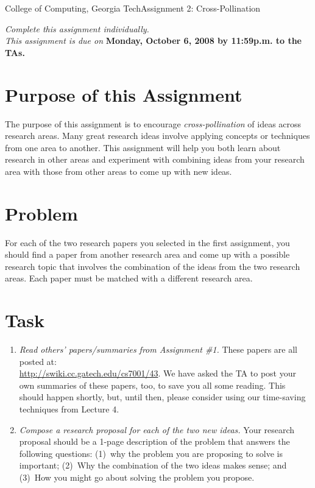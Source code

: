 \documentclass[11pt]{article}
\begin{document}


{College of Computing, Georgia Tech}{Assignment 2: Cross-Pollination}

{\em Complete this assignment individually. \\  This
  assignment is due on} {\bf Monday, October 6, 2008 by 11:59p.m. to
  the TAs.}

\section{Purpose of this Assignment}


The purpose of this assignment is to encourage {\em cross-pollination}
of ideas across research areas.  Many great research ideas involve
applying concepts or techniques from one area to another.  This
assignment will help you both learn about research in other areas and
experiment with combining ideas from your research area with those from
other areas to come up with new ideas.

\section{Problem}

For each of the two research papers you selected in the first
assignment, you should find a paper from another research area and come
up with a possible research topic that involves the combination of the
ideas from the two research areas.  Each paper must be matched with a
different research area.

\section{Task}

\begin{enumerate}
\itemsep=-1pt
\item {\em Read others' papers/summaries from Assignment \#1.} These
  papers are all posted at:\\ \url{http://swiki.cc.gatech.edu/cs7001/43}.
  We have asked the TA to post your own summaries of these papers, too,
  to save you all some reading.  This should happen shortly, but, until
  then, please consider using our time-saving techniques from Lecture 4.
%
\item {\em Compose a research proposal for each of the two new ideas.}  Your
research proposal should be a 1-page description of the problem that
answers the following questions: (1)~why the problem you are proposing
to solve is important; (2)~Why the combination of the two ideas makes
sense; and (3)~How you might go about solving the problem you propose.
\end{enumerate}
\end{document}
